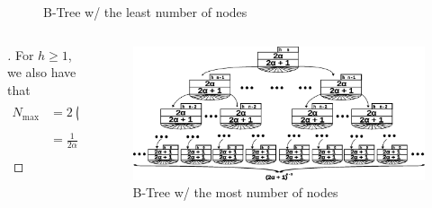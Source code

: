 \begin{frame}
\begin{columns}
\begin{column}{0.6\textwidth}
\begin{figure}
                \caption[]{B-Tree w/ the least number of nodes}
            \end{figure}
        \end{column}
    \end{columns}

    \framebreak{}

    \begin{columns}
        \begin{column}{0.4\textwidth}
            \begin{block}{}
                \begin{proof}[\unskip\nopunct]\renewcommand{\qedsymbol}{}
                    For \(h \geq 1\), we also have that
                    \[
                        \begin{aligned}
                            N_{\text{max}} &= 2\left(\sum^{h - 1}_{i = 0} \left(2\alpha + 1\right){}^i \right) \\
                            &= \frac{1}{2\alpha}\left(\left(2\alpha + 1\right){}^{h} - 1\right) \\
                        \end{aligned}
                    \]
                \end{proof}
            \end{block}
        \end{column}
        \begin{column}{0.6\textwidth}
            \begin{figure}
                \includegraphics[width=1\linewidth,keepaspectratio]{resources/made/generic_max_btree.eps}
                \caption[]{B-Tree w/ the most number of nodes}
            \end{figure}
        \end{column}
    \end{columns}
    \begin{columns}
        \begin{column}{\textlecolumn}

\end{column}
\end{columns}
\end{frame}

